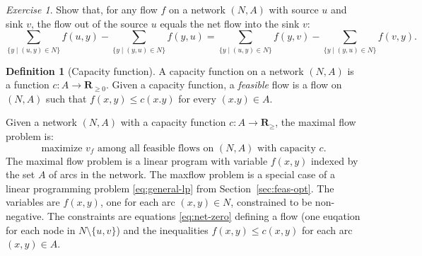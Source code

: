 \documentclass{amsbook}
\newcommand{\RR}{\mathbf R}
\theoremstyle{definition}
\newtheorem{definition}[theorem]{Definition}
\theoremstyle{remark}
\newtheorem{exercise}[theorem]{Exercise}
\begin{document}
\begin{exercise}
  Show that, for any flow $f$ on a network $(N,A)$ with source $u$ and sink $v$, the flow out of the source $u$ equals the net flow into the sink $v$:
  \begin{displaymath}
    \sum_{\{y\mid (u,y)\in N\}} f(u,y) - \sum_{\{y\mid (y,u)\in N\}} f(y,u) = \sum_{\{y\mid (u,y)\in N\}} f(y,v) - \sum_{\{y\mid (y,u)\in N\}} f(v,y).
  \end{displaymath}
\end{exercise}
\begin{definition}
  [Capacity function]
  A capacity function on a network $(N,A)$ is a function $c:A\to \RR_{\geq 0}$.
  Given a capacity function, a \emph{feasible} flow is a flow on $(N,A)$ such that $f(x,y)\leq c(x.y)$ for every $(x.y)\in A$.
\end{definition}
Given a network $(N,A)$ with a capacity function $c:A\to \RR_{\geq}$, the maximal flow problem is:
\begin{equation}
  \label{eq:flowmax}
  \tag{F}
  \text{maximize $v_f$ among all feasible flows on $(N,A)$ with capacity $c$.}
\end{equation}
The maximal flow problem is a linear program with variable $f(x,y)$ indexed by the set $A$ of arcs in the network.
The maxflow problem is a special case of a linear programming problem \eqref{eq:general-lp} from Section~\ref{sec:feas-opt}.
The variables are $f(x,y)$, one for each arc $(x,y)\in N$, constrained to be non-negative.
The constraints are equations \eqref{eq:net-zero} defining a flow (one euqation for each node in $N\setminus \{u,v\}$) and the inequalities $f(x,y)\leq c(x,y)$ for each arc $(x,y)\in A$. 


\end{document}
